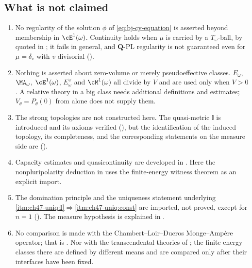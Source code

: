 \subsection{What is not claimed}
\label{sec:ch47-not-claimed}

\begin{enumerate}
\item No regularity of the solution $\phi$ of
      \eqref{eq:bj-cy-equation} is asserted beyond membership in
      $\cE^1(\omega)$.  Continuity holds when $\mu$ is carried by a
      $T_\omega$-ball, by \cite[Theorem~12.12 and
      Proposition~12.14(i)]{BJ22} quoted in
      ; it fails in general, and $\mathbf Q$-PL regularity is not guaranteed even for
      $\mu=\delta_v$ with $v$ divisorial
      (\cite[Theorem~60 and Examples~63, 65]{BJGreen24}).
\item Nothing is asserted about zero-volume or merely pseudoeffective
      classes.  $E_\omega$, $\MA_\omega$, $\cE^1(\omega)$,
      $E^\vee_\omega$ and $\cM^1(\omega)$ all divide by $V$ and are
      used only when $V>0$.  A relative theory in a big class needs additional definitions and
      estimates; $V_\theta=P_\theta(0)$ from
       alone does not supply them.
\item The strong topologies are not constructed here.  The quasi-metric
      $\mathbb I$ is introduced and its axioms verified
      (), but the identification of the induced
      topology, its completeness, and the corresponding statements on the
      measure side are 
      ().
\item Capacity estimates and quasicontinuity are developed in
      .  Here the nonpluripolarity
      deduction in  uses the finite-energy
      witness theorem as an explicit import.
\item The domination principle  and the
      uniqueness statement underlying
      \,\cref{itm:ch47-uniq:I}$\Rightarrow$\cref{itm:ch47-uniq:const}
      are imported, not proved, except for $n=1$
      (). The measure hypothesis is
      explained in .
\item No comparison is made with the Chambert--Loir--Ducros
      Monge--Amp\`ere operator; that is
      .  Nor with the transcendental theories of
      ; the finite-energy classes there are defined by
      different means and are compared only after their interfaces have
      been fixed.
\end{enumerate}

